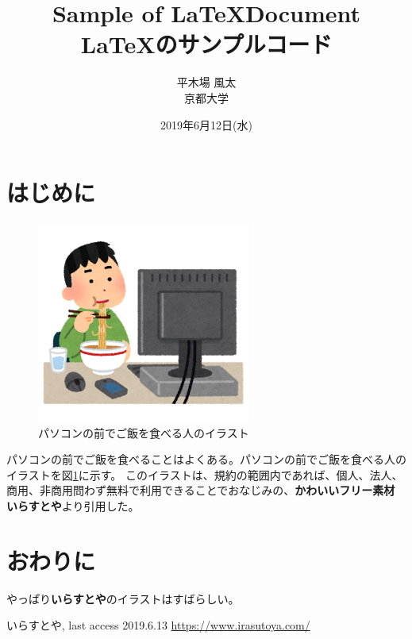 \documentclass[uplatex, twocolumn,10pt]{jsarticle}
\begin{document}
\title{\bf{\LARGE{Sample of \LaTeX  Document} \\ \Large{\LaTeX のサンプルコード}}}
\author{平木場 風太\\京都大学}
\date{2019年6月12日(水)}
\maketitle


\section{はじめに}
\begin{figure}[t]
    \begin{center}
        \includegraphics[width=7cm]{images/syokuji_computer.png}
        \caption{パソコンの前でご飯を食べる人のイラスト}
        \label{fig:syokuji_computer}
    \end{center}
\end{figure}

パソコンの前でご飯を食べることはよくある。パソコンの前でご飯を食べる人のイラストを図\ref{fig:syokuji_computer}に示す。
このイラストは、規約の範囲内であれば、個人、法人、商用、非商用問わず無料で利用できることでおなじみの、{\bf かわいいフリー素材 いらすとや}\cite{irasutoya}より引用した。

\section{おわりに}
やっぱり{\bf いらすとや}のイラストはすばらしい。

\begin{thebibliography}{99}
     いらすとや, last access 2019.6.13 \url{https://www.irasutoya.com/}



\end{thebibliography}
\end{document}

